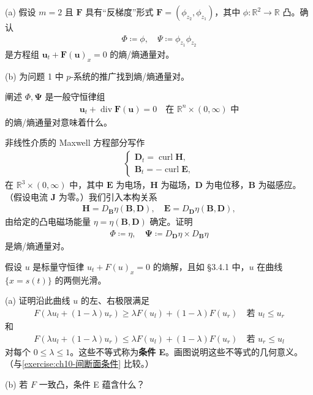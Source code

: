 \documentclass[../../main.tex]{subfiles}
\begin{document}
\begin{exercise}[反梯度通量函数。]\label{exercise:ch11-11}
(a) 假设 $m=2$ 且 $\mathbf{F}$ 具有``反梯度''形式 $\mathbf{F}=(\phi_{z_2},\phi_{z_1})$，其中 $\phi:\mathbb{R}^2\to\mathbb{R}$ 凸。确认
\begin{align*}
\Phi\coloneqq\phi,\quad \Psi\coloneqq\phi_{z_1}\phi_{z_2}
\end{align*}
是方程组 $\mathbf{u}_t+\mathbf{F}(\mathbf{u})_x=0$ 的熵/熵通量对。

(b) 为问题 1 中 $p$-系统的推广找到熵/熵通量对。
\end{exercise}

\begin{exercise}\label{exercise:ch11-12}
阐述 $\Phi,\boldsymbol{\Psi}$ 是一般守恒律组
\begin{align*}
\mathbf{u}_t+\operatorname{div}\mathbf{F}(\mathbf{u})=0 \quad \text{在 } \mathbb{R}^n\times(0,\infty) \text{ 中}
\end{align*}
的熵/熵通量对意味着什么。
\end{exercise}

\begin{exercise}\label{exercise:ch11-13}
非线性介质的 Maxwell 方程部分写作
\begin{align*}
\begin{cases}
\mathbf{D}_t=\operatorname{curl}\mathbf{H},\\
\mathbf{B}_t=-\operatorname{curl}\mathbf{E},
\end{cases}
\end{align*}
在 $\mathbb{R}^3\times(0,\infty)$ 中，其中 $\mathbf{E}$ 为电场，$\mathbf{H}$ 为磁场，$\mathbf{D}$ 为电位移，$\mathbf{B}$ 为磁感应。（假设电流 $\mathbf{J}$ 为零。）我们引入本构关系
\begin{align*}
\mathbf{H}=D_{\mathbf{B}}\eta(\mathbf{B},\mathbf{D}),\quad \mathbf{E}=D_{\mathbf{D}}\eta(\mathbf{B},\mathbf{D}),
\end{align*}
由给定的凸电磁场能量 $\eta=\eta(\mathbf{B},\mathbf{D})$ 确定。证明
\begin{align*}
\Phi\coloneqq\eta,\quad \boldsymbol{\Psi}\coloneqq D_{\mathbf{D}}\eta\times D_{\mathbf{B}}\eta
\end{align*}
是熵/熵通量对。
\end{exercise}

\begin{exercise}[非凸通量函数。]\label{exercise:ch11-14}假设 $u$ 是标量守恒律 $u_t+F(u)_x=0$ 的熵解，且如 \S3.4.1 中，$u$ 在曲线 $\{x=s(t)\}$ 的两侧光滑。

(a) 证明沿此曲线 $u$ 的左、右极限满足
\begin{align*}
F(\lambda u_l+(1-\lambda)u_r)\geqslant\lambda F(u_l)+(1-\lambda)F(u_r) \quad \text{若 } u_l\leqslant u_r
\end{align*}
和
\begin{align*}
F(\lambda u_l+(1-\lambda)u_r)\leqslant\lambda F(u_l)+(1-\lambda)F(u_r) \quad \text{若 } u_r\leqslant u_l
\end{align*}
对每个 $0\leqslant\lambda\leqslant 1$。这些不等式称为\textbf{条件 E}。画图说明这些不等式的几何意义。（与\cref{exercise:ch10-间断面条件} 比较。）

(b) 若 $F$ 一致凸，条件 E 蕴含什么？
\end{exercise}
\end{document}
